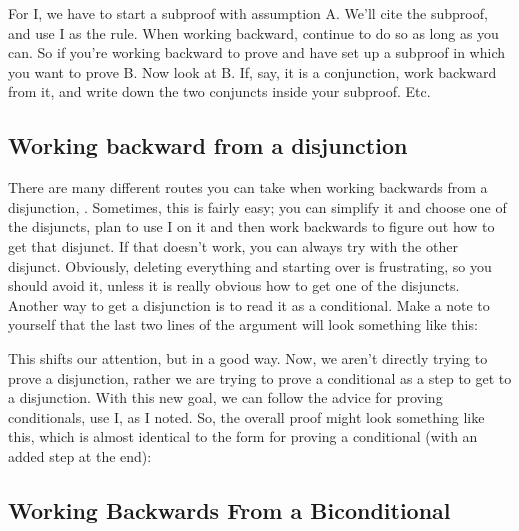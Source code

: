 For \enot I, we have to start a subproof with assumption A. We’ll cite the subproof, and use \enot I as the rule. When working backward, continue to do so as long as you can. So if you’re working backward to prove \eif{} and have set up a subproof in which you want to prove B. Now look at B. If, say, it is a conjunction, work backward from it, and write down the two conjuncts inside your subproof. Etc.

\subsection{Working backward from a disjunction}

There are many different routes you can take when working backwards from a disjunction, \eor{}. Sometimes, this is fairly easy; you can simplify it and choose one of the disjuncts, plan to use \eor I on it and then work backwards to figure out how to get that disjunct. If that doesn't work, you can always try with the other disjunct. Obviously, deleting everything and starting over is frustrating, so you should avoid it, unless it is really obvious how to get one of the disjuncts. Another way to get a disjunction is to read it as a conditional. Make a note to yourself that the last two lines of the argument will look something like this:
\begin{fitchproof}
 {}
\end{fitchproof}

This shifts our attention, but in a good way. Now, we aren't directly trying to prove a disjunction, rather we are trying to prove a conditional as a step to get to a disjunction. With this new goal, we can follow the advice for proving conditionals, use \eif I, as I noted. So, the overall proof might look something like this, which is almost identical to the form for proving a conditional (with an added step at the end): 
\begin{fitchproof}
\ellipsesline			
{}			
\open
{}			
\ellipsesline		
{}			
\close
{}
 	
\end{fitchproof}

\subsection{Working Backwards From a Biconditional}

